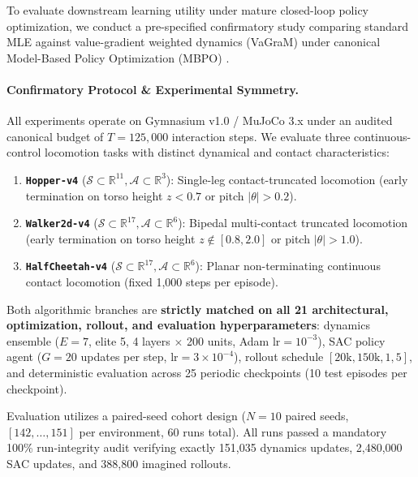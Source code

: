 \documentclass[journal,10pt,twocolumn]{IEEEtran}
\begin{document}
To evaluate downstream learning utility under mature closed-loop policy optimization, we conduct a pre-specified confirmatory study comparing standard MLE against value-gradient weighted dynamics (VaGraM) under canonical Model-Based Policy Optimization (MBPO) \cite{janner2019trust, voelcker2022value}.

\paragraph{Confirmatory Protocol \& Experimental Symmetry.}
All experiments operate on Gymnasium v1.0 / MuJoCo 3.x under an audited canonical budget of $T = 125,000$ interaction steps. We evaluate three continuous-control locomotion tasks with distinct dynamical and contact characteristics:
\begin{enumerate}
    \item \textbf{\texttt{Hopper-v4}} ($\mathcal{S} \subset \mathbb{R}^{11}, \mathcal{A} \subset \mathbb{R}^3$): Single-leg contact-truncated locomotion (early termination on torso height $z < 0.7$ or pitch $|\theta| > 0.2$).
    \item \textbf{\texttt{Walker2d-v4}} ($\mathcal{S} \subset \mathbb{R}^{17}, \mathcal{A} \subset \mathbb{R}^6$): Bipedal multi-contact truncated locomotion (early termination on torso height $z \notin [0.8, 2.0]$ or pitch $|\theta| > 1.0$).
    \item \textbf{\texttt{HalfCheetah-v4}} ($\mathcal{S} \subset \mathbb{R}^{17}, \mathcal{A} \subset \mathbb{R}^6$): Planar non-terminating continuous contact locomotion (fixed 1,000 steps per episode).
\end{enumerate}

Both algorithmic branches are \textbf{strictly matched on all 21 architectural, optimization, rollout, and evaluation hyperparameters}: dynamics ensemble ($E=7$, elite 5, 4 layers $\times$ 200 units, Adam $\text{lr}=10^{-3}$), SAC policy agent ($G=20$ updates per step, $\text{lr}=3\times 10^{-4}$), rollout schedule $[20\mathrm{k}, 150\mathrm{k}, 1, 5]$, and deterministic evaluation across 25 periodic checkpoints (10 test episodes per checkpoint). 

Evaluation utilizes a paired-seed cohort design ($N=10$ paired seeds, $[142, \dots, 151]$ per environment, 60 runs total). All runs passed a mandatory 100\% run-integrity audit verifying exactly 151,035 dynamics updates, 2,480,000 SAC updates, and 388,800 imagined rollouts.
\end{document}

